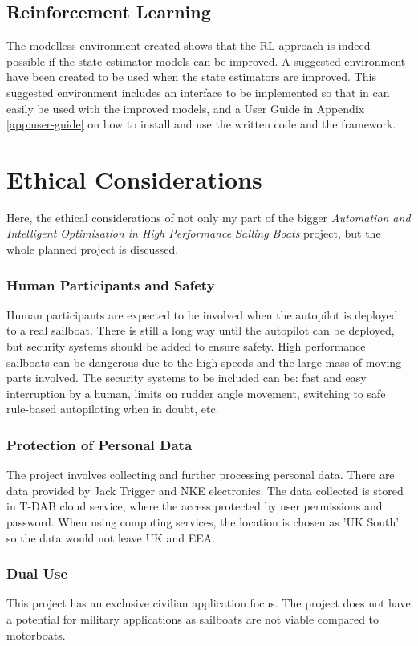 \documentclass[12pt,twoside]{report}
\begin{document}
\subsection{Reinforcement Learning}
The modelless environment created shows that the RL approach is indeed possible if the state estimator models can be improved. A suggested environment have been created to be used when the state estimators are improved. This suggested environment includes an interface to be implemented so that in can easily be used with the improved models, and a User Guide in Appendix \ref{app:user-guide} on how to install and use the written code and the framework.

\section{Ethical Considerations}

Here, the ethical considerations of not only my part of the bigger \textit{Automation and Intelligent Optimisation in High Performance Sailing Boats} project, but the whole planned project is discussed.

\subsubsection{Human Participants and Safety}
Human participants are expected to be involved when the autopilot is deployed to a real sailboat. There is still a long way until the autopilot can be deployed, but security systems should be added to ensure safety. High performance sailboats can be dangerous due to the high speeds and the large mass of moving parts involved. The security systems to be included can be: fast and easy interruption by a human, limits on rudder angle movement, switching to safe rule-based autopiloting when in doubt, etc.

\subsubsection{Protection of Personal Data}
The project involves collecting and further processing personal data. There are data provided by Jack Trigger and NKE electronics. The data collected is stored in T-DAB cloud service, where the access protected by user permissions and password. When using computing services, the location is chosen as 'UK South' so the data would not leave UK and EEA.

\subsubsection{Dual Use}
This project has an exclusive civilian application focus. The project does not have a potential for military applications as sailboats are not viable compared to motorboats.
\end{document}
